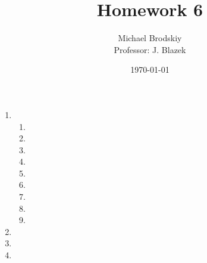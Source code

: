 


\title{Homework 6}
\date{\today}
\author{Michael Brodskiy\\ \small Professor: J. Blazek}



\maketitle

\begin{enumerate}

  \item

    \begin{enumerate}

      \item 

      \item 

      \item 

      \item 

      \item 

      \item 

      \item 

      \item 

      \item 

    \end{enumerate}

  \item

  \item

  \item

\end{enumerate}




